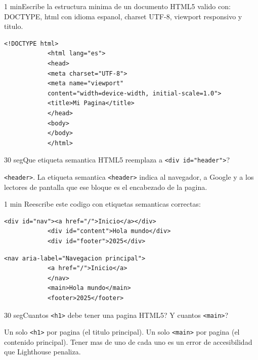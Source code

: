 \documentclass[11pt,a4paper]{article}
\newcounter{nej}
\newcommand{\ej}[2]{%
	\stepcounter{nej}%
	\begin{ejercicio}{\arabic{nej}}{#1}#2\end{ejercicio}\vspace{4pt}}
\begin{document}
	\ej{1 min}{Escribe la estructura minima de un documento HTML5 valido con: DOCTYPE, html con idioma espanol, charset UTF-8, viewport responsivo y titulo.}
	
	\begin{respuesta}
		\begin{lstlisting}[style=codehtml]
			<!DOCTYPE html>
			<html lang="es">
			<head>
			<meta charset="UTF-8">
			<meta name="viewport"
			content="width=device-width, initial-scale=1.0">
			<title>Mi Pagina</title>
			</head>
			<body>
			</body>
			</html>
		\end{lstlisting}
	\end{respuesta}
	\vspace{6pt}
	
	\ej{30 seg}{Que etiqueta semantica HTML5 reemplaza a \texttt{<div id="header">}?}
	
	\begin{respuesta}
		\texttt{<header>}. La etiqueta semantica \texttt{<header>} indica al navegador, a Google y a los lectores de pantalla que ese bloque es el encabezado de la pagina.
	\end{respuesta}
	\vspace{6pt}
	
	\stepcounter{nej}
	\begin{ejercicio}{}{1 min}
		Reescribe este codigo con etiquetas semanticas correctas:
		\begin{lstlisting}[style=codehtml]
			<div id="nav"><a href="/">Inicio</a></div>
			<div id="content">Hola mundo</div>
			<div id="footer">2025</div>
		\end{lstlisting}
	\end{ejercicio}
	\vspace{4pt}
	
	\begin{respuesta}
		\begin{lstlisting}[style=codehtml]
			<nav aria-label="Navegacion principal">
			<a href="/">Inicio</a>
			</nav>
			<main>Hola mundo</main>
			<footer>2025</footer>
		\end{lstlisting}
	\end{respuesta}
	\vspace{6pt}
	
	\ej{30 seg}{Cuantos \texttt{<h1>} debe tener una pagina HTML5? Y cuantos \texttt{<main>}?}
	
	\begin{respuesta}
		Un solo \texttt{<h1>} por pagina (el titulo principal). Un solo \texttt{<main>} por pagina (el contenido principal). Tener mas de uno de cada uno es un error de accesibilidad que Lighthouse penaliza.
	\end{respuesta}
	\vspace{6pt}
	
\end{document}
